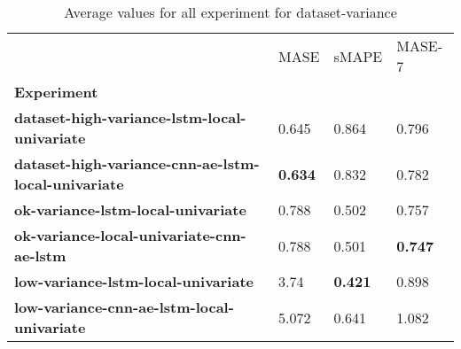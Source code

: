 \begin{table}[H]
\centering
\caption{Average values for all experiment for dataset-variance}
\label{table:Average-metric-dataset-variance}
\begin{tabular}{llll}
\toprule
{} &            MASE &           sMAPE &          MASE-7 \\
\textbf{Experiment                                        } &                 &                 &                 \\
\midrule
\textbf{dataset-high-variance-lstm-local-univariate       } &           0.645 &           0.864 &           0.796 \\
\textbf{dataset-high-variance-cnn-ae-lstm-local-univariate} &  \textbf{0.634} &           0.832 &           0.782 \\
\textbf{ok-variance-lstm-local-univariate                 } &           0.788 &           0.502 &           0.757 \\
\textbf{ok-variance-local-univariate-cnn-ae-lstm          } &           0.788 &           0.501 &  \textbf{0.747} \\
\textbf{low-variance-lstm-local-univariate                } &            3.74 &  \textbf{0.421} &           0.898 \\
\textbf{low-variance-cnn-ae-lstm-local-univariate         } &           5.072 &           0.641 &           1.082 \\
\bottomrule
\end{tabular}
\end{table}
